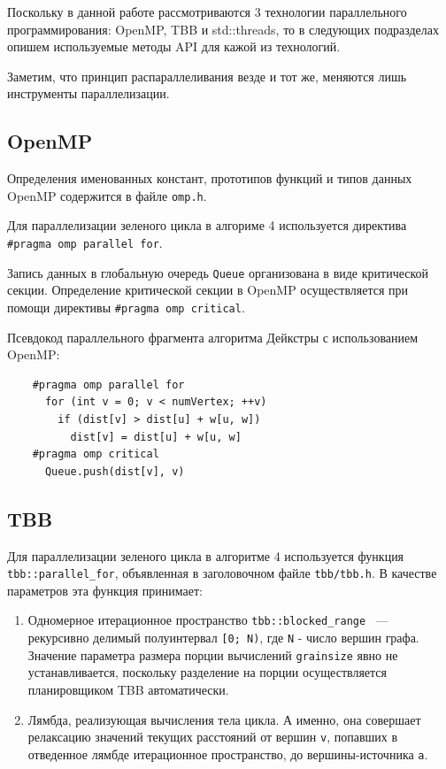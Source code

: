 \documentclass{article}
\begin{document}
\par Поскольку в данной работе рассмотриваются 3 технологии параллельного программирования: OpenMP, TBB и std::threads, то в следующих подразделах опишем используемые методы API для кажой из технологий.

\par Заметим, что принцип распараллеливания везде и тот же, меняются лишь инструменты параллелизации.

\subsection{OpenMP}
Определения именованных констант, прототипов функций и типов данных OpenMP содержится в файле \verb|omp.h|. 
\par Для параллелизации зеленого цикла в алгориме 4 используется директива \verb|#pragma omp parallel for|. 
\par Запись данных в глобальную очередь \verb|Queue| организована в виде критической секции. Определение критической секции в OpenMP осуществляется при помощи директивы \verb|#pragma omp critical|.
\par Псевдокод параллельного фрагмента алгоритма Дейкстры с использованием OpenMP:

\vspace{10pt}
\begin{lstlisting}
    #pragma omp parallel for
      for (int v = 0; v < numVertex; ++v)
        if (dist[v] > dist[u] + w[u, w])
          dist[v] = dist[u] + w[u, w]
    #pragma omp critical
	  Queue.push(dist[v], v)
\end{lstlisting}
\vspace{-25pt}

\subsection{TBB}
Для параллелизации зеленого цикла в алгоритме 4 используется функция
\verb|tbb::parallel_for|, объявленная в заголовочном файле \verb|tbb/tbb.h|. В качестве параметров эта функция принимает:

\begin{enumerate}
\item Одномерное итерационное пространство \verb|tbb::blocked_range| ~--- рекурсивно делимый полуинтервал \verb|[0; N)|, где \verb|N| - число вершин графа. Значение параметра размера порции вычислений \verb|grainsize| явно не устанавливается, поскольку разделение на порции осуществляется планировщиком TBB автоматически.

\item Лямбда, реализующая вычисления тела цикла. А именно, она совершает релаксацию значений текущих расстояний от вершин \verb|v|, попавших в отведенное лямбде итерационное пространство, до вершины-источника \verb|a|.
\end{enumerate}
\end{document}
